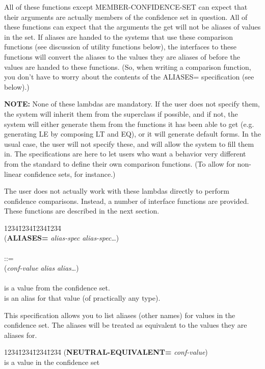All of these functions except MEMBER-CONFIDENCE-SET can expect that
their arguments are actually members of the confidence set in
question. All of these functions can expect that the arguments the get
will not be aliases of values in the set. If aliases are handed to the
systems that use these comparison functions (see discussion of utility
functions below), the interfaces to these functions will convert the
aliases to the values they are aliases of before the values are handed
to these functions. (So, when writing a comparison function, you don't
have to worry about the contents of the ALIASES= specification (see
below).)

{\bf NOTE:} None of these lambdas are mandatory. If the user does not
specify them, the system will inherit them from the superclass if
possible, and if not, the system will either generate them from the
functions it has been able to get (e.g. generating LE by composing LT
and EQ), or it will generate default forms. In the usual case, the
user will not specify these, and will allow the system to fill them in.
The specifications are here to let users who want a behavior very
different from the standard to define their own comparison functions.
(To allow for non-linear confidence sets, for instance.)

The user does not actually work with these lambdas directly to perform
confidence comparisons. Instead, a number of interface functions are
provided. These functions are described in the next section.



\begin{tabbing}
1234\=1234\=1234\=1234\= \kill
\\
({\bf ALIASES=} {\it alias-spec\/} {\it alias-spec\/}\ldots)\\
\\
 ::= \\
\>\>({\it conf-value\/} {\it alias\/} {\it alias\/}\ldots) \\
\\
\>\> is a value from the confidence set. \\
\>\> is an alias for that value (of practically any type).\\
\end{tabbing}
This specification allows you to list aliases (other names) for values
in the confidence set. The aliases will be treated as equivalent to
the values they are aliases for.


\begin{tabbing}
1234\=1234\=1234\=1234\= \kill
({\bf NEUTRAL-EQUIVALENT=} {\it conf-value})\\
 is a value in the confidence set
\end{tabbing}

